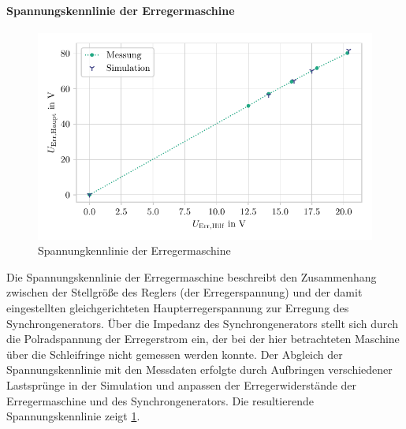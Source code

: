 \paragraph{Spannungskennlinie der Erregermaschine}
\begin{figure}[h!]
    \centering
    \includegraphics{Bilder/Validierung_Erregermaschine.pdf}
    \caption{Spannungkennlinie der Erregermaschine}
    \label{fig:Validierung-Erregermaschine}
\end{figure}
Die Spannungskennlinie der Erregermaschine beschreibt den Zusammenhang zwischen der Stellgröße des Reglers (der Erregerspannung) und der damit eingestellten gleichgerichteten Haupterregerspannung zur Erregung des Synchrongenerators. Über die Impedanz des Synchrongenerators stellt sich durch die Polradspannung der Erregerstrom ein, der bei der hier betrachteten Maschine über die Schleifringe nicht gemessen werden konnte. Der Abgleich der Spannungskennlinie mit den Messdaten erfolgte durch Aufbringen verschiedener Lastsprünge in der Simulation und anpassen der Erregerwiderstände der Erregermaschine und des Synchrongenerators. Die resultierende Spannungskennlinie zeigt \cref{fig:Validierung-Erregermaschine}.

